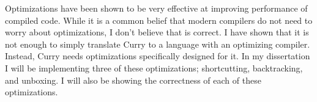 Optimizations have been shown to be very effective at improving performance of compiled code.
While it is a common belief that modern compilers do not need to worry about optimizations, I don't believe that is correct.
I have shown that it is not enough to simply translate Curry to a language with an optimizing compiler.
Instead, Curry needs optimizations specifically designed for it.
In my dissertation I will be implementing three of these optimizations; shortcutting, backtracking, and unboxing.
I will also be showing the correctness of each of these optimizations.

